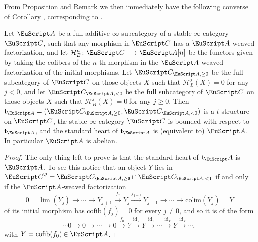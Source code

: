 From Proposition  and Remark  we then immediately have the following converse of Corollary , corresponding to \cite[Lemma 3.2]{Brid}.
\begin{proposition}\label{to.be.repeated.verbatim}
Let $\cA$ be a full additive $\infty$-subcategory of a stable $\infty$-category $\C$, such that  any morphism in $\C$ has a $\cA$-weaved factorization, and let
$\mathcal{H}^n_B\colon \C\to \cA[n]$ be the functors given by taking the cofibers of the $n$-th morphism in the $\cA$-weaved factorization of the initial morphisms. 
 Let
$\C_{\cA,\geq 0}$ be the full subcategory of $\C$ on those objects $X$ such that $\mathcal{H}^j_B(X)=0$ for any $j< 0$, and let $\C_{\cA,< 0}$ be the full subcategory of $\C$ on those objects $X$ such that $\mathcal{H}^j_B(X)=0$ for any $j\geq 0$. Then $\mathfrak{t}_{\cA}=(\C_{\cA,\geq 0}, \C_{\cA,<0})$ is a $t$-structure on $\C$, the stable $\infty$-category $\C$ is bounded with respect to $\mathfrak{t}_{\cA}$, and the standard heart of $\mathfrak{t}_{\cA}$ is (equivalent to) $\cA$. In particular $\cA$ is abelian.
\end{proposition}
\begin{proof}
The only thing left to prove is that the standard heart of  $\mathfrak{t}_\cA$ is $\cA$. To see this notice that an object $Y$ lies in $\C^\heart=\C_{\cA,\geq 0}\cap \C_{\cA,<1}$ if and only if the $\cA$-weaved factorization
\[
0 =\lim(Y_j)\to\cdots \to Y_{j+1} \xrightarrow{f_{j}} Y_{j} \xrightarrow{f_{j-1}}Y_{j-1}\to \cdots\to \mathrm{colim}(Y_j)=Y
\]
of its initial morphism has $\mathrm{cofib}(f_j)=0$ for every $j\neq0$, and so it is of the form
\[
\cdots 0 \to 0\to \cdots \to 0\xrightarrow{f_{0}} Y \xrightarrow{\mathrm{id}_Y}Y\xrightarrow{\mathrm{id}_Y} \cdots\xrightarrow{\mathrm{id}_Y}Y\xrightarrow{\mathrm{id}_Y}\cdots,\] 
with $Y=\mathrm{cofib}(f_0)\in \cA$.
\end{proof}